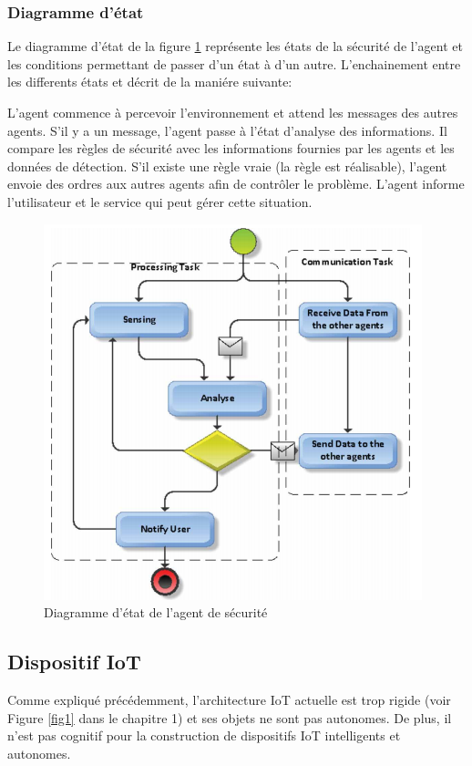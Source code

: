 \subsubsection{Diagramme d'état}
Le diagramme d'état de la figure \ref{fc10} représente les états de la sécurité de l'agent et les conditions permettant de passer d'un état à d’un autre. L'enchainement entre les differents états et décrit de la maniére suivante: 


 L'agent commence à percevoir  l'environnement et attend les messages des autres agents. S'il y a un message, l'agent passe à l'état d'analyse des informations. Il compare les règles de sécurité avec les informations fournies par les agents et les données de détection. S'il existe une règle vraie (la règle est réalisable), l'agent envoie des ordres aux autres agents afin de contrôler le problème. L'agent informe l'utilisateur et le service qui peut gérer cette situation.



\begin{figure}[H]
\centering
\includegraphics[scale=0.8]{chap1/fc10.png}
\caption{Diagramme d'état de l'agent de sécurité}
\label{fc10}
\end{figure}
\subsection{Dispositif IoT}
Comme expliqué précédemment, l'architecture IoT actuelle est trop rigide (voir Figure \ref{fig1} dans le chapitre 1) et ses objets ne sont pas autonomes. De plus, il n'est pas cognitif pour la construction de dispositifs IoT intelligents et autonomes.


